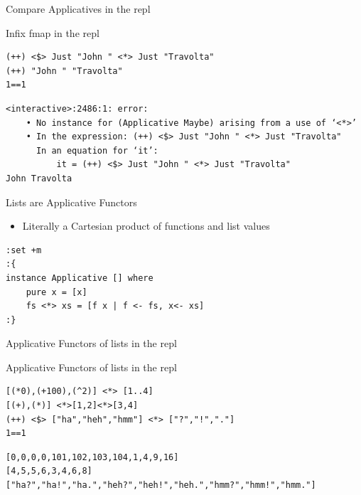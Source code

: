 \documentclass[presetation]{beamer}
\begin{document}
\begin{frame}[fragile,label={sec:orgf537aa7}]{Compare Applicatives in the repl}
 \begin{block}{Infix fmap in the repl}
\begin{verbatim}
(++) <$> Just "John " <*> Just "Travolta"
(++) "John " "Travolta"
1==1 
\end{verbatim}

\begin{verbatim}
<interactive>:2486:1: error:
    • No instance for (Applicative Maybe) arising from a use of ‘<*>’
    • In the expression: (++) <$> Just "John " <*> Just "Travolta"
      In an equation for ‘it’:
          it = (++) <$> Just "John " <*> Just "Travolta"
John Travolta
\end{verbatim}
\end{block}
\end{frame}

\begin{frame}[fragile,label={sec:org585440b}]{Lists are Applicative Functors}
 \begin{definition}
\begin{itemize}
\item Literally a Cartesian product of functions and list values
\end{itemize}
\begin{verbatim}
:set +m
:{
instance Applicative [] where
    pure x = [x]
    fs <*> xs = [f x | f <- fs, x<- xs]
:}
\end{verbatim}
\end{definition}
\end{frame}

\begin{frame}[fragile,label={sec:org87c8ddc}]{Applicative Functors of lists in the repl}
 \begin{block}{Applicative Functors of lists in the repl}
\begin{verbatim}
[(*0),(+100),(^2)] <*> [1..4]
[(+),(*)] <*>[1,2]<*>[3,4]
(++) <$> ["ha","heh","hmm"] <*> ["?","!","."]
1==1
\end{verbatim}

\begin{verbatim}
[0,0,0,0,101,102,103,104,1,4,9,16]
[4,5,5,6,3,4,6,8]
["ha?","ha!","ha.","heh?","heh!","heh.","hmm?","hmm!","hmm."]
\end{verbatim}
\end{block}
\end{frame}
\end{document}
